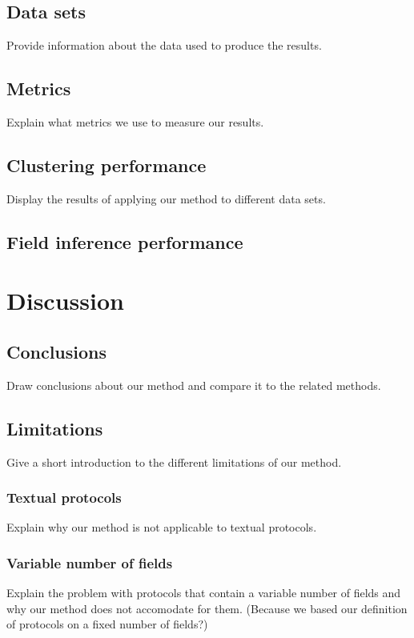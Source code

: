 \documentclass[a4paper]{report}
\begin{document}
\section{Data sets}
Provide information about the data used to produce the results.

\section{Metrics}
Explain what metrics we use to measure our results.

\section{Clustering performance}
Display the results of applying our method to different data sets.

\section{Field inference performance}

\chapter{Discussion}

\section{Conclusions}
Draw conclusions about our method and compare it to the related methods.

\section{Limitations}
Give a short introduction to the different limitations of our method.

\subsection{Textual protocols}
Explain why our method is not applicable to textual protocols.

\subsection{Variable number of fields}
Explain the problem with protocols that contain a variable number of fields and
why our method does not accomodate for them. (Because we based our definition
of protocols on a fixed number of fields?)
\end{document}

